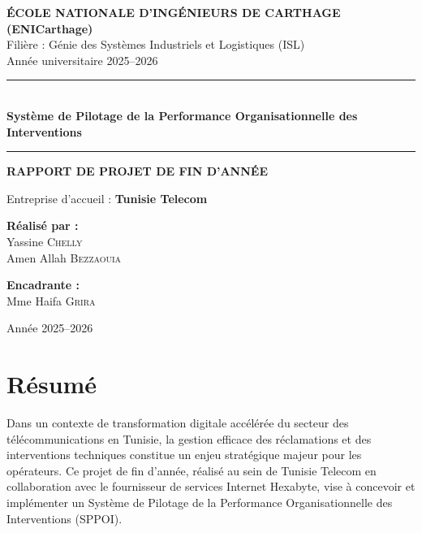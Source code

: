\documentclass[11pt,a4paper]{report}
\begin{document}
\begin{titlepage}
\centering
\vspace*{1cm}

{\large\bfseries ÉCOLE NATIONALE D'INGÉNIEURS DE CARTHAGE (ENICarthage)}\\[0.3cm]
{\large Filière : Génie des Systèmes Industriels et Logistiques (ISL)}\\[0.3cm]
{\large Année universitaire 2025--2026}

\vspace{1.5cm}
\rule{\linewidth}{1.5pt}\\[0.4cm]

{\Huge\bfseries\color{blue!60!black}
Système de Pilotage de la Performance Organisationnelle des Interventions}

\vspace{0.4cm}
\rule{\linewidth}{1.5pt}

\vspace{1cm}
{\LARGE\bfseries RAPPORT DE PROJET DE FIN D'ANNÉE}

\vspace{1cm}
{\large Entreprise d'accueil : \textbf{Tunisie Telecom}}

\vfill

\begin{minipage}[t]{0.45\textwidth}
\raggedright
\textbf{Réalisé par :}\\[0.3cm]
Yassine \textsc{Chelly}\\
Amen Allah \textsc{Bezzaouia}
\end{minipage}
\hfill
\begin{minipage}[t]{0.45\textwidth}
\raggedleft
\textbf{Encadrante :}\\[0.3cm]
Mme Haifa \textsc{Grira}
\end{minipage}

\vspace{1.5cm}
{\large Année 2025--2026}
\end{titlepage}

\chapter*{Résumé}

Dans un contexte de transformation digitale accélérée du secteur des télécommunications en Tunisie, la gestion efficace des réclamations et des interventions techniques constitue un enjeu stratégique majeur pour les opérateurs. Ce projet de fin d'année, réalisé au sein de Tunisie Telecom en collaboration avec le fournisseur de services Internet Hexabyte, vise à concevoir et implémenter un Système de Pilotage de la Performance Organisationnelle des Interventions (SPPOI).
\end{document}
